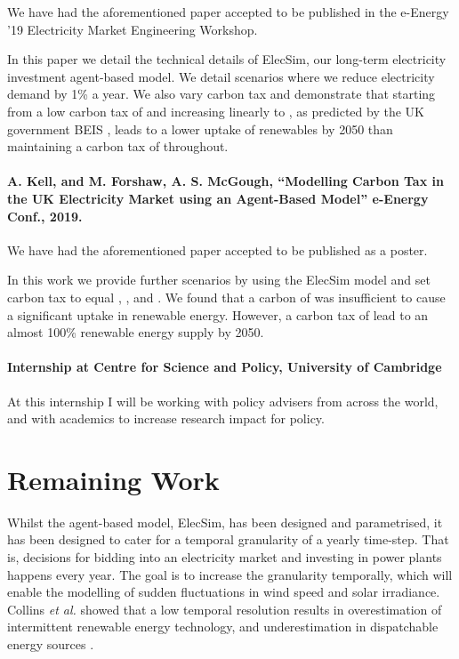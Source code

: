 \documentclass[12pt]{article}
\begin{document}
We have had the aforementioned paper accepted to be published in the e-Energy '19 Electricity Market Engineering Workshop.

In this paper we detail the technical details of ElecSim, our long-term electricity investment agent-based model. We detail scenarios where we reduce electricity demand by 1\% a year. We also vary carbon tax and demonstrate that starting from a low carbon tax of  and increasing linearly to , as predicted by the UK government BEIS \cite{Kell2018}, leads to a lower uptake of renewables by 2050 than maintaining a carbon tax of  throughout.

\paragraph{A. Kell, and M. Forshaw, A. S. McGough, “Modelling Carbon Tax in the UK Electricity Market using an Agent-Based Model” e-Energy Conf., 2019.}

We have had the aforementioned paper accepted to be published as a poster.

In this work we provide further scenarios by using the ElecSim model and set carbon tax to equal , , and . We found that a carbon of  was insufficient to cause a significant uptake in renewable energy. However, a carbon tax of  lead to an almost 100\% renewable energy supply by 2050.


\paragraph{Internship at Centre for Science and Policy, University of Cambridge}

At this internship I will be working with policy advisers from across the world, and with academics to increase research impact for policy.

\clearpage

\section{Remaining Work}

Whilst the agent-based model, ElecSim, has been designed and parametrised, it has been designed to cater for a temporal granularity of a yearly time-step. That is, decisions for bidding into an electricity market and investing in power plants happens every year. The goal is to increase the granularity temporally, which will enable the modelling of sudden fluctuations in wind speed and solar irradiance. Collins \textit{et al.} showed that a low temporal resolution results in overestimation of intermittent renewable energy technology, and underestimation in dispatchable energy sources \cite{Collins2017}.
\end{document}
